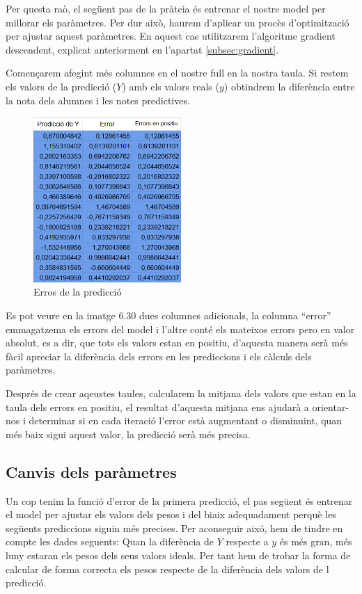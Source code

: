 Per questa raò, el següent pas de la pràtcia és entrenar el nostre model per millorar els paràmetres. Per dur això, haurem d'aplicar un procès d'optimització per ajustar aquest paràmetres. En aquest cas utilitzarem l'algoritme gradient descendent, explicat anteriorment en l'apartat \ref{subsec:gradient}.

Començarem afegint més columnes en el nostre full en la nostra taula. Si restem els valors de la predicció ($Y$) amb els valors reals ($y$) obtindrem la diferència entre la nota dels alumnes i les notes predictives.

\begin{figure}[H]
    \centering
    \includegraphics[width=0.5\textwidth]{./figures/Errors.png}
    \caption{Erros de la predicció}
\end{figure}

Es pot veure en la imatge 6.30 dues columnes adicionals, la columna ``error'' emmagatzema els errors del model i l'altre conté els mateixos errors pero en valor absolut, es a dir, que tots els valors estan en positiu, d'aquesta manera serà més fàcil apreciar la diferència dels errors en les prediccions i els càlculs dels paràmetres.

Després de crear aqeustes taules, calcularem la mitjana dels valors que estan en la taula dels errors en positiu, el resultat d'aquesta mitjana ens ajudarà a orientar-nos i determinar si en cada iteració l'error està augmentant o disminuint, quan més baix sigui aquest valor, la predicció serà més precisa.
\subsection{Canvis dels paràmetres}
Un cop tenim la funció d'error de la primera predicció, el pas següent és entrenar el model per ajustar els valors dels pesos i del biaix adequadament perquè les següents prediccions siguin més precises.
Per aconseguir aixó, hem de tindre en compte les dades seguents: Quan la diferència de $Y$ respecte a $y$ és més gran, més luny estaran els pesos dels seus valors ideals. Per tant hem de trobar la forma de calcular de forma correcta els pesos respecte de la diferència dels valors de l predicció.


